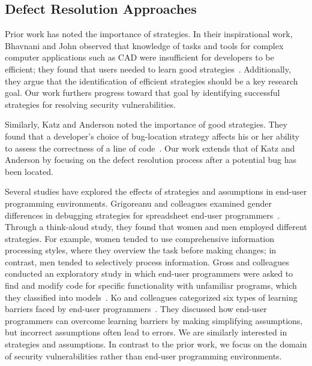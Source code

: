 \documentclass[10pt,journal,compsoc]{IEEEtran}
\begin{document}

\subsection{Defect Resolution Approaches}
\label{strategies}
Prior work has noted the importance of strategies.
In their inspirational work, Bhavnani and John observed that knowledge of tasks and tools for complex computer applications such as CAD were insufficient for developers to be efficient; they found that users needed to learn good strategies~\cite{Bhavnani2000}. 
Additionally, they argue that the identification of efficient strategies should be a key research goal. 
Our work furthers progress toward that goal by identifying successful strategies for resolving security vulnerabilities.

Similarly, Katz and Anderson noted the importance of good strategies. 
They found that a developer's choice of bug-location strategy affects his or her ability to assess the correctness of a line of code~\cite{Katz:1987}.
Our work extends that of Katz and Anderson by focusing on the defect resolution process after a potential bug has been located.

Several studies have explored the effects of strategies and assumptions in end-user programming environments.
Grigoreanu and colleagues examined gender differences in debugging strategies for spreadsheet end-user programmers~\cite{Grigoreanu:2012:sense, Grigoreanu:2009}. 
Through a think-aloud study, they found that women and men employed different strategies. 
For example, women tended to use comprehensive information processing styles, where they overview the task before making changes; in contrast, men tended to selectively process information.
Gross and colleagues conducted an exploratory study in which end-user programmers were asked to find and modify code for specific functionality with unfamiliar programs, which they classified into models~\cite{Gross:2010}.
Ko and colleagues categorized six types of learning barriers faced by end-user programmers~\cite{Ko:2004:barriers}.
They discussed how end-user programmers can overcome learning barriers by making simplifying assumptions, but incorrect assumptions often lead to errors.
We are similarly interested in strategies and assumptions.
In contrast to the prior work, we focus on the domain of security vulnerabilities rather than end-user programming environments.


\end{document}
